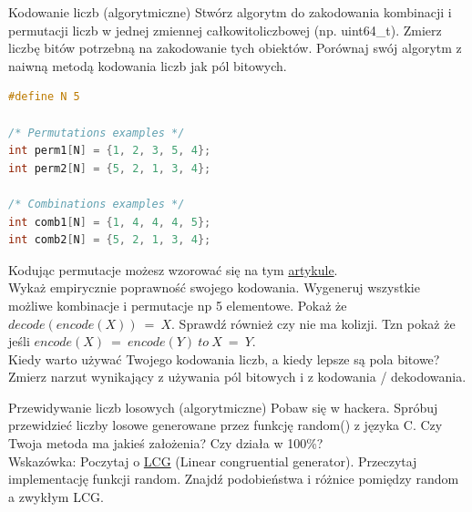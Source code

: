 \begin{exercise}{Kodowanie liczb (algorytmiczne)}{}
Stwórz algorytm do zakodowania kombinacji i permutacji liczb w jednej zmiennej całkowitoliczbowej (np. uint64\_t). Zmierz liczbę bitów potrzebną na zakodowanie tych obiektów. Porównaj swój algorytm z naiwną metodą kodowania liczb jak pól bitowych. 
\begin{lstlisting}[language=C,style=C99]
#define N 5

/* Permutations examples */
int perm1[N] = {1, 2, 3, 5, 4};
int perm2[N] = {5, 2, 1, 3, 4};

/* Combinations examples */
int comb1[N] = {1, 4, 4, 4, 5};
int comb2[N] = {5, 2, 1, 3, 4};
\end{lstlisting}

Kodując permutacje możesz wzorować się na tym \href{https://medium.com/@egonelbre/fast-permutation-compression-4b5e3fe91094}{artykule}. \\

Wykaż empirycznie poprawność swojego kodowania. Wygeneruj wszystkie możliwe kombinacje i permutacje np 5 elementowe.
Pokaż że $decode(encode(X))\ =\ X$. Sprawdź również czy nie ma kolizji. Tzn pokaż że jeśli $encode(X)\ =\ encode(Y)\ to\ X\ =\ Y$. \\

Kiedy warto używać Twojego kodowania liczb, a kiedy lepsze są pola bitowe? \\
Zmierz narzut wynikający z używania pól bitowych i z kodowania / dekodowania.
\end{exercise}

\begin{exercise}{Przewidywanie liczb losowych (algorytmiczne)}{}
Pobaw się w hackera. Spróbuj przewidzieć liczby losowe generowane przez funkcję random() z języka C.
Czy Twoja metoda ma jakieś założenia? Czy działa w 100\%? \\

Wskazówka: Poczytaj o \href{https://en.wikipedia.org/wiki/Linear_congruential_generator}{LCG} (Linear congruential generator). Przeczytaj implementację funkcji random. Znajdź podobieństwa i różnice pomiędzy random a zwykłym LCG.
\end{exercise}

